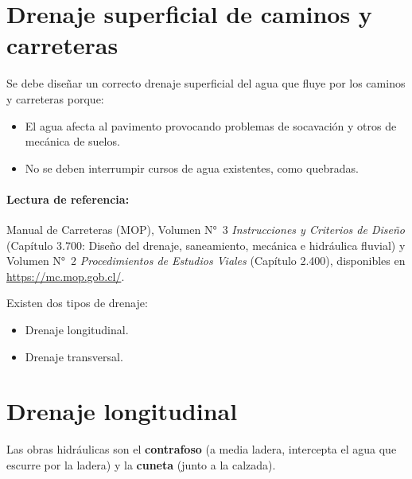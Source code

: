 
\section{Drenaje superficial de caminos y carreteras}
Se debe diseñar un correcto drenaje superficial del agua que fluye por los
caminos y carreteras porque:
\begin{itemize}
  \item El agua afecta al pavimento provocando problemas de socavación y
        otros de mecánica de suelos.
  \item No se deben interrumpir cursos de agua existentes, como quebradas.
\end{itemize}
\paragraph{Lectura de referencia:} Manual de Carreteras (MOP), Volumen N°~3
\emph{Instrucciones y Criterios de Diseño} (Capítulo 3.700: Diseño del
drenaje, saneamiento, mecánica e hidráulica fluvial) y Volumen N°~2
\emph{Procedimientos de Estudios Viales} (Capítulo 2.400), disponibles en
\url{https://mc.mop.gob.cl/}.

Existen dos tipos de drenaje:
\begin{itemize}
  \item Drenaje longitudinal.
  \item Drenaje transversal.
\end{itemize}

\section{Drenaje longitudinal}
Las obras hidráulicas son el \textbf{contrafoso} (a media ladera, intercepta
el agua que escurre por la ladera) y la \textbf{cuneta} (junto a la calzada).

